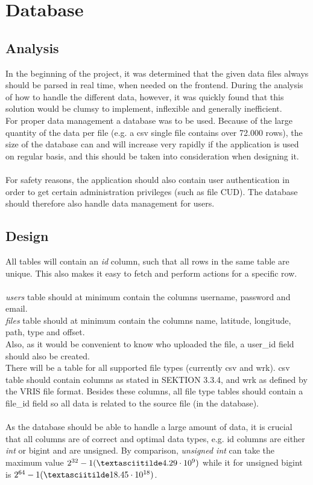 \chapter{Database}

\section{Analysis}

In the beginning of the project, it was determined that the given data files always should be parsed in real time, when needed on the frontend. During the analysis of how to handle the different data, however, it was quickly found that this solution would be clumsy to implement, inflexible and generally inefficient.\\
For proper data management a database was to be used. Because of the large quantity of the data per file (e.g. a csv single file contains over 72.000 rows), the size of the database can and will increase very rapidly if the application is used on regular basis, and this should be taken into consideration when designing it.\\\\
For safety reasons, the application should also contain user authentication in order to get certain administration privileges (such as file CUD). The database should therefore also handle data management for users.\\

\section{Design}
All tables will contain an \textit{id} column, such that all rows in the same table are unique. This also makes it easy to fetch and perform actions for a specific row.\\\\
\textit{users} table should at minimum contain the columns \textsf{username, password} and \textsf{email}.\\
\textit{files} table should at minimum contain the columns \textsf{name, latitude, longitude, path, type} and \textsf{offset}.\\ Also, as it would be convenient to know who uploaded the file, a \textsf{user_id} field should also be created.\\
There will be a table for all supported file types (currently \textsf{csv} and \textsf{wrk}). \textsf{csv} table should contain columns as stated in SEKTION 3.3.4, and \textsf{wrk} as defined by the VRIS file format. Besides these columns, all file type tables should contain a \textsf{file_id} field so all data is related to the source file (in the database).\\\\
As the database should be able to handle a large amount of data, it is crucial that all columns are of correct and optimal data types, e.g. \textsf{id} columns are either \textit{int} or \textsf{bigint} and are \textsf{unsigned}. By comparison, \textit{unsigned int} can take the maximum value $2^{32}-1 (\textasciitilde 4.29 \cdot 10^{9})$ while it for \textsf{unsigned bigint} is $ 2^{64}-1 (\textasciitilde 18.45 \cdot 10^{18})$.

